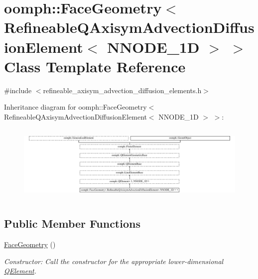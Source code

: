 \hypertarget{classoomph_1_1FaceGeometry_3_01RefineableQAxisymAdvectionDiffusionElement_3_01NNODE__1D_01_4_01_4}{}\section{oomph\+:\+:Face\+Geometry$<$ Refineable\+Q\+Axisym\+Advection\+Diffusion\+Element$<$ N\+N\+O\+D\+E\+\_\+1D $>$ $>$ Class Template Reference}
\label{classoomph_1_1FaceGeometry_3_01RefineableQAxisymAdvectionDiffusionElement_3_01NNODE__1D_01_4_01_4}


{\ttfamily \#include $<$refineable\+\_\+axisym\+\_\+advection\+\_\+diffusion\+\_\+elements.\+h$>$}

Inheritance diagram for oomph\+:\+:Face\+Geometry$<$ Refineable\+Q\+Axisym\+Advection\+Diffusion\+Element$<$ N\+N\+O\+D\+E\+\_\+1D $>$ $>$\+:\begin{figure}[H]
\begin{center}
\leavevmode
\includegraphics[height=3.747610cm]{classoomph_1_1FaceGeometry_3_01RefineableQAxisymAdvectionDiffusionElement_3_01NNODE__1D_01_4_01_4}
\end{center}
\end{figure}
\subsection*{Public Member Functions}
\begin{DoxyCompactItemize}
\item 
\hyperlink{classoomph_1_1FaceGeometry_3_01RefineableQAxisymAdvectionDiffusionElement_3_01NNODE__1D_01_4_01_4_a7a38fcc420a26f5dbffe3a18d1aec31e}{Face\+Geometry} ()
\begin{DoxyCompactList}\small\item\em Constructor\+: Call the constructor for the appropriate lower-\/dimensional \hyperlink{classoomph_1_1QElement}{Q\+Element}. \end{DoxyCompactList}\end{DoxyCompactItemize}
